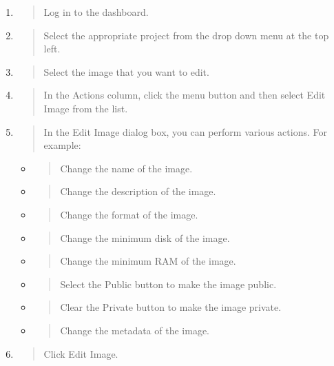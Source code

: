 \begin{enumerate}
\def\labelenumi{\arabic{enumi}.}
\item
  \begin{quote}
  Log in to the dashboard.
  \end{quote}
\item
  \begin{quote}
  Select the appropriate project from the drop down menu at the top
  left.
  \end{quote}
\item
  \begin{quote}
  Select the image that you want to edit.
  \end{quote}
\item
  \begin{quote}
  In the Actions column, click the menu button and then select Edit
  Image from the list.
  \end{quote}
\item
  \begin{quote}
  In the Edit Image dialog box, you can perform various actions. For
  example:
  \end{quote}

  \begin{itemize}
  \item
    \begin{quote}
    Change the name of the image.
    \end{quote}
  \item
    \begin{quote}
    Change the description of the image.
    \end{quote}
  \item
    \begin{quote}
    Change the format of the image.
    \end{quote}
  \item
    \begin{quote}
    Change the minimum disk of the image.
    \end{quote}
  \item
    \begin{quote}
    Change the minimum RAM of the image.
    \end{quote}
  \item
    \begin{quote}
    Select the Public button to make the image public.
    \end{quote}
  \item
    \begin{quote}
    Clear the Private button to make the image private.
    \end{quote}
  \item
    \begin{quote}
    Change the metadata of the image.
    \end{quote}
  \end{itemize}
\item
  \begin{quote}
  Click Edit Image.
  \end{quote}
\end{enumerate}
